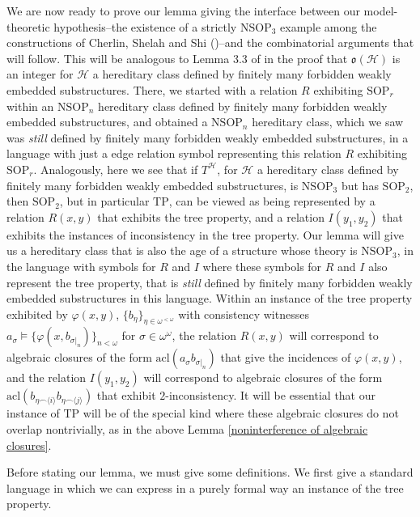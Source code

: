 \documentclass{amsart}
\theoremstyle{definition}
\theoremstyle{remark}
\numberwithin{equation}{section}
\begin{document}
We are now ready to prove our lemma giving the interface between our model-theoretic hypothesis--the existence of a strictly $\mathrm{NSOP}_{3}$ example among the constructions of Cherlin, Shelah and Shi (\cite{CSS99})--and the combinatorial arguments that will follow. This will be analogous to Lemma 3.3 of \cite{ApproxOrder} in the proof that $\mathfrak{o}(\mathcal{H})$ is an integer for $\mathcal{H}$ a hereditary class defined by finitely many forbidden weakly embedded substructures. There, we started with a relation $R$ exhibiting $\mathrm{SOP}_{r}$ within an $\mathrm{NSOP}_{n}$ hereditary class defined by finitely many forbidden weakly embedded substructures, and obtained a $\mathrm{NSOP}_{n}$ hereditary class, which we saw was \textit{still} defined by finitely many forbidden weakly embedded substructures, in a language with just a edge relation symbol representing this relation $R$ exhibiting $\mathrm{SOP}_{r}$. Analogously, here we see that if $T^{\mathcal{H}}$, for $\mathcal{H}$ a hereditary class defined by finitely many forbidden weakly embedded substructures, is $\mathrm{NSOP}_{3}$ but has $\mathrm{SOP}_{2}$, then $\mathrm{SOP}_{2}$, but in particular $\mathrm{TP}$, can be viewed as being represented by a relation $R(x, y)$ that exhibits the tree property, and a relation $I(y_{1}, y_{2})$ that exhibits the instances of inconsistency in the tree property. Our lemma will give us a hereditary class that is also the age of a structure whose theory is $\mathrm{NSOP}_{3}$, in the language with symbols for $R$ and $I$ where these symbols for $R$ and $I$ also represent the tree property, that is \textit{still} defined by finitely many forbidden weakly embedded substructures in this language. Within an instance of the tree property exhibited by $\varphi(x,y)$, $\{b_{\eta}\}_{\eta \in \omega^{< \omega}}$  with consistency witnesses $a_{\sigma} \models \{ \varphi(x, b_{\sigma|_{n}})\}_{n < \omega}$ for $\sigma \in \omega^{\omega}$, the relation $R(x, y)$ will correspond to algebraic closures of the form $\mathrm{acl}(a_{\sigma}b_{\sigma|_{n}})$ that give the incidences of $\varphi(x, y)$, and the relation $I(y_{1}, y_{2})$ will correspond to algebraic closures of the form $\mathrm{acl}(b_{\eta \smallfrown \langle i \rangle}b_{\eta \smallfrown \langle j \rangle})$ that exhibit $2$-inconsistency. It will be essential that our instance of $\mathrm{TP}$ will be of the special kind where these algebraic closures do not overlap nontrivially, as in the above Lemma \ref{noninterference of algebraic closures}.

Before stating our lemma, we must give some definitions. We first give a standard language in which we can express in a purely formal way an instance of the tree property.
\end{document}
